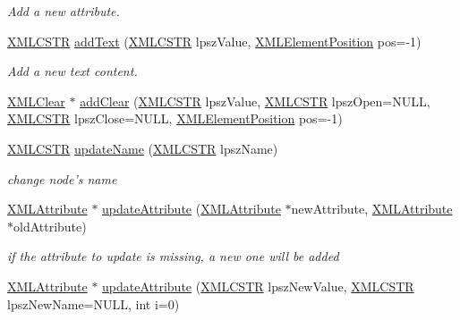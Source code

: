 \begin{DoxyCompactItemize}
\begin{DoxyCompactList}\small\item\em Add a new attribute. \end{DoxyCompactList}\item 
\hyperlink{xmlParser_8h_acdb0d6fd8dd596384b438d86cfb2b182}{X\-M\-L\-C\-S\-T\-R} \hyperlink{group__creation_ga1de718e237befa215381d294fc644f11}{add\-Text} (\hyperlink{xmlParser_8h_acdb0d6fd8dd596384b438d86cfb2b182}{X\-M\-L\-C\-S\-T\-R} lpsz\-Value, \hyperlink{xmlParser_8h_aab10d65aadeca1f026f6416becde7432}{X\-M\-L\-Element\-Position} pos=-\/1)
\begin{DoxyCompactList}\small\item\em Add a new text content. \end{DoxyCompactList}\item 
\hyperlink{structXMLClear}{X\-M\-L\-Clear} $\ast$ \hyperlink{group__creation_gafb513cd0d881bcb153d702a885aebc44}{add\-Clear} (\hyperlink{xmlParser_8h_acdb0d6fd8dd596384b438d86cfb2b182}{X\-M\-L\-C\-S\-T\-R} lpsz\-Value, \hyperlink{xmlParser_8h_acdb0d6fd8dd596384b438d86cfb2b182}{X\-M\-L\-C\-S\-T\-R} lpsz\-Open=N\-U\-L\-L, \hyperlink{xmlParser_8h_acdb0d6fd8dd596384b438d86cfb2b182}{X\-M\-L\-C\-S\-T\-R} lpsz\-Close=N\-U\-L\-L, \hyperlink{xmlParser_8h_aab10d65aadeca1f026f6416becde7432}{X\-M\-L\-Element\-Position} pos=-\/1)
\item 
\hyperlink{xmlParser_8h_acdb0d6fd8dd596384b438d86cfb2b182}{X\-M\-L\-C\-S\-T\-R} \hyperlink{group__xmlUpdate_gae08b643a2b87a77bad3c70eb57ea3043}{update\-Name} (\hyperlink{xmlParser_8h_acdb0d6fd8dd596384b438d86cfb2b182}{X\-M\-L\-C\-S\-T\-R} lpsz\-Name)
\begin{DoxyCompactList}\small\item\em change node's name \end{DoxyCompactList}\item 
\hyperlink{structXMLAttribute}{X\-M\-L\-Attribute} $\ast$ \hyperlink{group__xmlUpdate_ga49449139e44ef214d0c861e0b84f3757}{update\-Attribute} (\hyperlink{structXMLAttribute}{X\-M\-L\-Attribute} $\ast$new\-Attribute, \hyperlink{structXMLAttribute}{X\-M\-L\-Attribute} $\ast$old\-Attribute)
\begin{DoxyCompactList}\small\item\em if the attribute to update is missing, a new one will be added \end{DoxyCompactList}\item 
\hyperlink{structXMLAttribute}{X\-M\-L\-Attribute} $\ast$ \hyperlink{group__xmlUpdate_ga43e30a2630824996f5eb74ffcfa54adf}{update\-Attribute} (\hyperlink{xmlParser_8h_acdb0d6fd8dd596384b438d86cfb2b182}{X\-M\-L\-C\-S\-T\-R} lpsz\-New\-Value, \hyperlink{xmlParser_8h_acdb0d6fd8dd596384b438d86cfb2b182}{X\-M\-L\-C\-S\-T\-R} lpsz\-New\-Name=N\-U\-L\-L, int i=0)

\end{DoxyCompactItemize}
